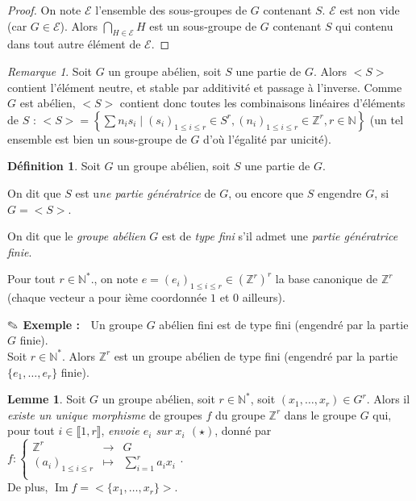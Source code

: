 \documentclass{article}
\newcommand{\Z}{\mathbb{Z}}
\newcommand{\N}{\mathbb{N}}
\newcommand{\im}{\mathop{\mathrm{Im}}\nolimits}
\newcommand{\dis}{\displaystyle}
\newcommand{\nt}[1]{\llbracket  #1 \rrbracket }
\theoremstyle{definition}
\newtheorem{defi}{Définition}
\newtheorem{lem}{Lemme}
\theoremstyle{remark}
\newtheorem{rem}{Remarque}
\newcommand{\exem}{{\textbf{$\text{\ding{46}}$ Exemple : \ }}}
\newcommand{\app}[5]{#1:\left\{\begin{array}{rcl}
#2 & \longrightarrow & #3 \\
#4 & \longmapsto & #5  \\
\end{array}\right.
}
\begin{document}
\begin{proof}
On note $\mathcal{E}$ l'ensemble des sous-groupes de $G$ contenant $S$. $\mathcal{E}$ est non vide (car $G \in\mathcal{E}$). Alors $\dis \bigcap_{H \in \mathcal{E}} H$ est un sous-groupe de $G$ contenant $S$ qui contenu dans tout autre élément de $\mathcal{E}$.
\end{proof}

\begin{rem}
Soit $G$ un groupe abélien, soit $S$ une partie de $G$. Alors $<S>$ contient l'élément neutre, et stable par additivité et passage à l'inverse. Comme $G$ est abélien, $<S>$ contient donc toutes les combinaisons linéaires d'éléments de $S$ : $<S>=\left\{\dis \sum n_is_i \mid (s_i)_{1 \leqslant i \leqslant r} \in S^r, (n_i)_{1 \leqslant i \leqslant r} \in \Z^r, r \in \N \right\}$ (un tel ensemble est bien un sous-groupe de $G$ d'où l'égalité par unicité).
\end{rem}

\begin{defi}
Soit $G$ un groupe abélien, soit $S$ une partie de $G$. 
\begin{point}
\item On dit que $S$ est u\textit{ne partie génératrice} de $G$, ou encore que $S$ engendre $G$, si $G=<S>$.
\item On dit que le \textit{groupe abélien} $G$ est de \textit{type fini} s'il admet une \textit{partie génératrice finie}. 
\end{point}
\end{defi}

Pour tout $r \in \N^*$., on note $e=(e_i)_{1 \leqslant i \leqslant r} \in (\Z^r)^r$ la base canonique de $\Z^r$ (chaque vecteur a pour ième coordonnée $1$ et $0$ ailleurs).

\exem Un groupe $G$ abélien fini est de type fini (engendré par la partie $G$ finie). \\
Soit $r \in \N^*$. Alors $\Z^r$ est un groupe abélien de type fini (engendré par la partie $\{e_1, \ldots, e_r \}$ finie).

\begin{lem}
Soit $G$ un groupe abélien, soit $r \in \N^*$, soit $(x_1, \ldots, x_r) \in G^r$. Alors il \textit{existe un unique morphisme} de groupes $f$ du groupe $\Z^r$ dans le groupe $G$ qui, pour tout $i \in \nt{1,r}$, \textit{envoie $e_i$ sur $x_i$ $(\star)$}, donné par $\app{f}{\Z^r}{G}{(a_i)_{1 \leqslant i \leqslant r}}{\dis \sum_{i=1}^ra_ix_i}$. \\ De plus, $\im f =<\{x_1, \ldots, x_r\}>$.
\end{lem}
\end{document}
